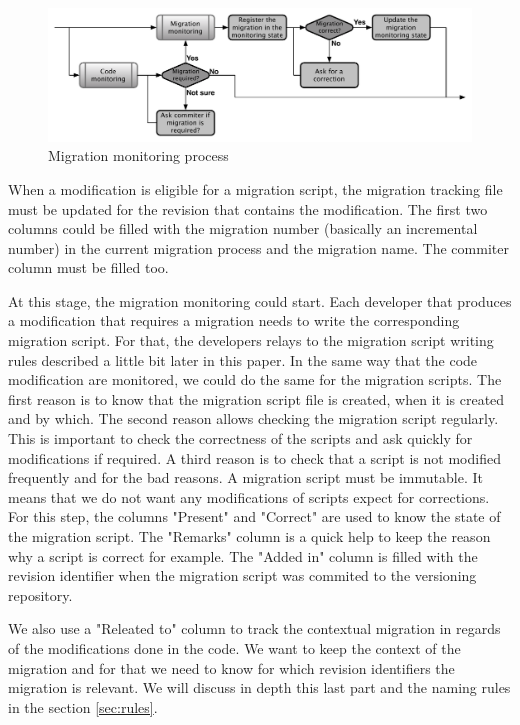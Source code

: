 \begin{figure}[h]
        \centering
        \includegraphics[scale=0.55]{images/MigrationDetetcionProcess.pdf}
        \caption{Migration monitoring process}
        \label{fig:migDetProc}
\end{figure}

When a modification is eligible for a migration script, the migration tracking file must be updated for the revision that contains the modification. The first two columns could be filled with the migration number (basically an incremental number) in the current migration process and the migration name. The commiter column must be filled too.

At this stage, the migration monitoring could start. Each developer that produces a modification that requires a migration needs to write the corresponding migration script. For that, the developers relays to the migration script writing rules described a little bit later in this paper. In the same way that the code modification are monitored, we could do the same for the migration scripts. The first reason is to know that the migration script file is created, when it is created and by which. The second reason allows checking the migration script regularly. This is important to check the correctness of the scripts and ask quickly for modifications if required. A third reason is to check that a script is not modified frequently and for the bad reasons. A migration script must be immutable. It means that we do not want any modifications of scripts expect for corrections. For this step, the columns "Present" and "Correct" are used to know the state of the migration script. The "Remarks" column is a quick help to keep the reason why a script is correct for example. The "Added in" column is filled with the revision identifier when the migration script was commited to the versioning repository.

We also use a "Releated to" column to track the contextual migration in regards of the modifications done in the code. We want to keep the context of the migration and for that we need to know for which revision identifiers the migration is relevant. We will discuss in depth this last part and the naming rules in the section \autoref{sec:rules}.

